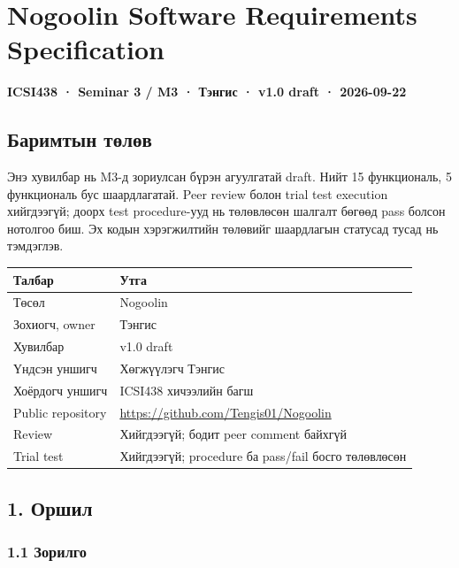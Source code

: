 \documentclass[
  mongolian,
]{article}
\author{}
\date{}
\begin{document}


\section{Nogoolin Software Requirements
Specification}\label{nogoolin-software-requirements-specification}

\textbf{ICSI438 · Seminar 3 / M3 · Тэнгис · v1.0 draft · 2026-09-22}

\subsection{Баримтын
төлөв}\label{ux431ux430ux440ux438ux43cux442ux44bux43d-ux442ux4e9ux43bux4e9ux432}

Энэ хувилбар нь M3-д зориулсан бүрэн агуулгатай draft. Нийт 15
функциональ, 5 функциональ бус шаардлагатай. Peer review болон trial
test execution хийгдээгүй; доорх test procedure-ууд нь төлөвлөсөн
шалгалт бөгөөд pass болсон нотолгоо биш. Эх кодын хэрэгжилтийн төлөвийг
шаардлагын статусад тусад нь тэмдэглэв.

\begin{longtable}[]{@{}ll@{}}
\toprule\noalign{}
Талбар & Утга \\
\midrule\noalign{}
\endhead
\bottomrule\noalign{}
\endlastfoot
Төсөл & Nogoolin \\
Зохиогч, owner & Тэнгис \\
Хувилбар & v1.0 draft \\
Үндсэн уншигч & Хөгжүүлэгч Тэнгис \\
Хоёрдогч уншигч & ICSI438 хичээлийн багш \\
Public repository & \url{https://github.com/Tengis01/Nogoolin} \\
Review & Хийгдээгүй; бодит peer comment байхгүй \\
Trial test & Хийгдээгүй; procedure ба pass/fail босго төлөвлөсөн \\
\end{longtable}

\subsection{1. Оршил}\label{ux43eux440ux448ux438ux43b}

\subsubsection{1.1 Зорилго}\label{ux437ux43eux440ux438ux43bux433ux43e}
\end{document}
